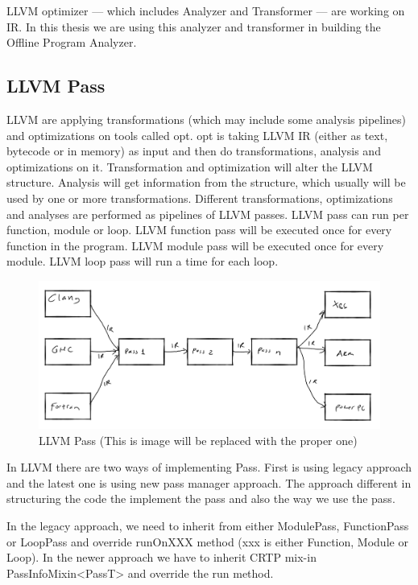 LLVM optimizer — which includes Analyzer and Transformer — are working on IR. In this thesis we are using this analyzer and transformer in building the Offline Program Analyzer.

\subsection{LLVM Pass}

LLVM are applying transformations (which may include some analysis pipelines) 
and optimizations on tools called opt.
opt is taking LLVM IR (either as text, bytecode or in memory) as input and then 
do transformations, analysis and optimizations on it. Transformation and 
optimization will alter the LLVM structure. Analysis will get information from 
the structure, which usually will be used by one or more transformations. 
Different transformations, optimizations and analyses are performed as 
pipelines of LLVM passes. LLVM pass can run per function, module or loop. LLVM 
function pass will be executed once for every function in the program. LLVM 
module pass will be executed once for every module. LLVM loop pass will run a 
time for each loop. 

\begin{figure}[htbp]
\centerline{\includegraphics[scale=.25]{Figures/llvm.png}}
\caption{LLVM Pass (This is image will be replaced with the proper one)}
\label{fig:2-2}
\end{figure}

In LLVM there are two ways of implementing Pass. First is using legacy approach and the latest one is using new pass manager approach. The approach different in structuring the code the implement the pass and also the way we use the pass. 

In the legacy approach, we need to inherit from either ModulePass, FunctionPass or LoopPass and override runOnXXX method (xxx is either Function, Module or Loop). In the newer approach we have to inherit CRTP mix-in PassInfoMixin<PassT> and override the run method.

